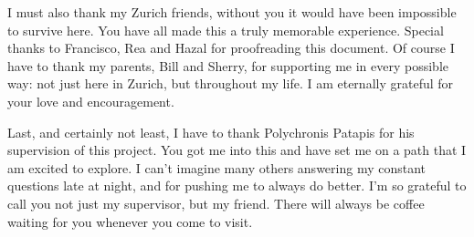 I must also thank my Zurich friends, without you it would have been impossible to survive here.
You have all made this a truly memorable experience.
Special thanks to Francisco, Rea and Hazal for proofreading this document.
Of course I have to thank my parents, Bill and Sherry, for supporting me in every possible way: not just here in Zurich, but throughout my life. 
I am eternally grateful for your love and encouragement.

Last, and certainly not least, I have to thank Polychronis Patapis for his supervision of this project. 
You got me into this and have set me on a path that I am excited to explore.
I can't imagine many others answering my constant questions late at night, and for pushing me to always do better. 
I'm so grateful to call you not just my supervisor, but my friend. 
There will always be coffee waiting for you whenever you come to visit.

\bigskip
\bigskip
